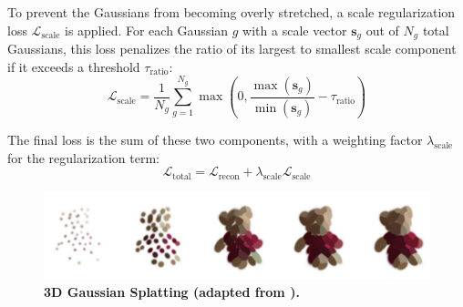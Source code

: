To prevent the Gaussians from becoming overly stretched, a scale regularization loss $\mathcal{L}_{\text{scale}}$ is applied. For each Gaussian $g$ with a scale vector $\mathbf{s}_g$ out of $N_g$ total Gaussians, this loss penalizes the ratio of its largest to smallest scale component if it exceeds a threshold $\tau_{\text{ratio}}$:
\begin{equation}
	\mathcal{L}_{\text{scale}} = \frac{1}{N_g} \sum_{g=1}^{N_g} \max \left( 0, \frac{\max(\mathbf{s}_g)}{\min(\mathbf{s}_g)} - \tau_{\text{ratio}} \right)
\end{equation}

The final loss is the sum of these two components, with a weighting factor $\lambda_{\text{scale}}$ for the regularization term:
\begin{equation}
	\mathcal{L}_{\text{total}} = \mathcal{L}_{\text{recon}} + \lambda_{\text{scale}}\mathcal{L}_{\text{scale}}
\end{equation}

\begin{figure}[t]
	\centering
	\includegraphics[width=\linewidth]{figures/gaussian_splatting.png}
	\caption{\bfseries 3D Gaussian Splatting (adapted from \cite{dalal_gaussian_2024}).}
	\label{fig:gaussian_splatting}
\end{figure}
